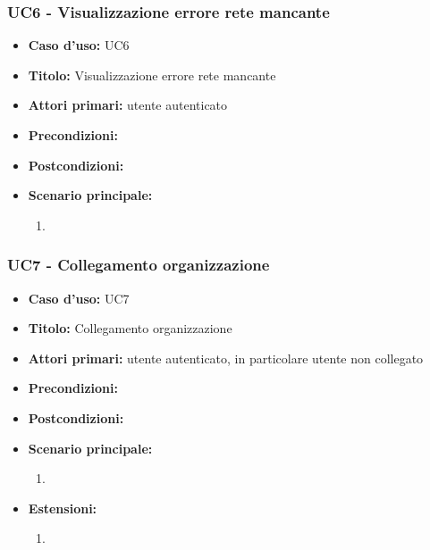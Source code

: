 \documentclass[casi-duso]{subfiles}
\begin{document}
\subsubsection{UC6 - Visualizzazione errore rete mancante}
\label{subsub:uc6utente}
\begin{itemize}
  \item \textbf{Caso d’uso:} UC6
  \item \textbf{Titolo:} Visualizzazione errore rete mancante
  \item \textbf{Attori primari:} utente autenticato
  \item \textbf{Precondizioni:} 
  \item \textbf{Postcondizioni:}
  \item \textbf{Scenario principale:} 
  \begin{enumerate}
    \item 
  \end{enumerate}  
\end{itemize}

\subsubsection{UC7 - Collegamento organizzazione}
\label{subsub:uc7utente}
\begin{itemize}
  \item \textbf{Caso d’uso:} UC7
  \item \textbf{Titolo:} Collegamento organizzazione
  \item \textbf{Attori primari:} utente autenticato, in particolare utente non collegato
  \item \textbf{Precondizioni:} 
  \item \textbf{Postcondizioni:}
  \item \textbf{Scenario principale:} 
  \begin{enumerate}
    \item 
  \end{enumerate}  
  \item \textbf{Estensioni:} 
  \begin{enumerate}
    \item 
  \end{enumerate}  
\end{itemize}

\end{document}
